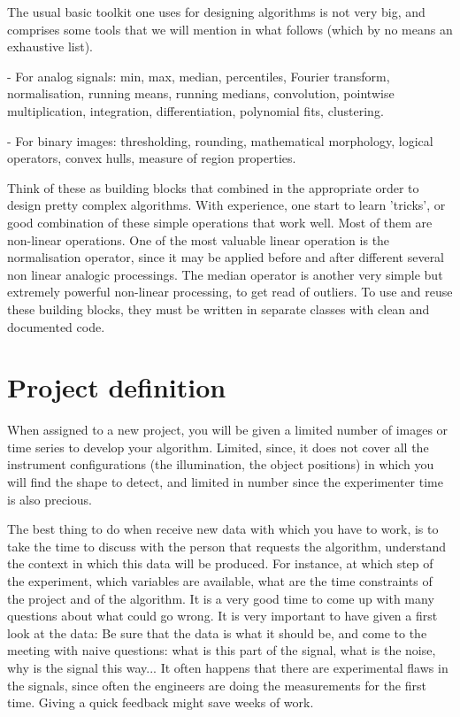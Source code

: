 \documentclass[24pt]{article}
\begin{document}
The usual basic toolkit one uses for designing algorithms is not very big, 
and comprises  some tools that we will mention in what follows (which  by no means an exhaustive list).

- For analog signals: min, max, median, percentiles, Fourier transform, normalisation, running means, running medians, convolution, pointwise multiplication, integration, differentiation, polynomial fits, clustering. 

 - For binary images: thresholding, rounding,  mathematical morphology, logical operators, convex hulls, measure of region properties.


Think of these as building blocks that combined in the appropriate order to design pretty complex  algorithms.  With experience, one start to learn 'tricks', or good combination of these simple operations that work well. Most of them are non-linear operations. One of the most valuable linear operation is the normalisation operator, since it may be applied before and after different several non linear 
analogic processings. The median operator is another very simple but extremely powerful non-linear processing, to get read of outliers.
To use and reuse these building blocks, they must be  written in separate classes with clean and documented code. 

 \section{Project definition}
   When assigned to a new project, you will be given a limited number of images or time series to develop your algorithm. Limited, since, it does not cover all the instrument configurations (the illumination, the object positions) in which you will find the shape to detect, and limited in number since the experimenter time is also precious. 
  
  
  The best thing to do when receive new data with which you have to work, is to take the time to discuss with the person that requests the algorithm, understand the context in which this data will be produced. For instance, at which step of the experiment,  which variables are available, what are the time constraints of the project and of the algorithm.
It is a very good time to come up with many questions about what could go wrong. It is very important to have given a first look at the data:  Be sure that the data is what it should be, and come to the meeting with naive questions: what is this part of the signal, what is the noise, why is the signal this way... It often happens  that there are experimental flaws in the signals, since often the engineers are doing the  measurements for the first time. Giving a quick feedback might save weeks of work.
 
\end{document}
